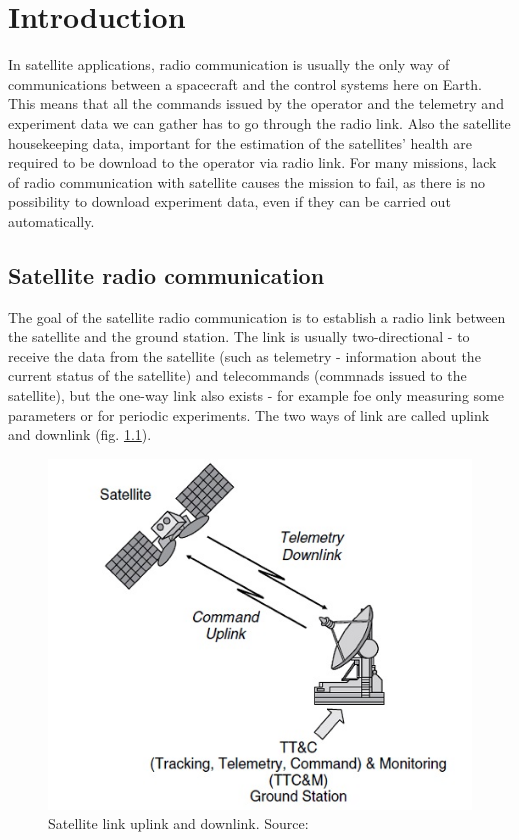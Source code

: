 \chapter{Introduction}
In satellite applications, radio communication is usually the only way of communications between a spacecraft and the control systems here on Earth. This means that all the commands issued by the operator and the telemetry and experiment data we can gather has to go through the radio link. Also the satellite housekeeping data, important for the estimation of the satellites' health are required to be download to the operator via radio link. For many missions, lack of radio communication with satellite causes the mission to fail, as there is no possibility to download experiment data, even if they can be carried out automatically.

\section{Satellite radio communication}
The goal of the satellite radio communication is to establish a radio link between the satellite and the ground station. The link is usually two-directional - to receive the data from the satellite (such as telemetry - information about the current status of the satellite) and telecommands (commnads issued to the satellite), but the one-way link also exists - for example foe only measuring some parameters or for periodic experiments. The two ways of link are called uplink and downlink (fig. \ref{intro:uplink_downlink}). 
\begin{figure}[h]
    \centering
    \includegraphics[width=0.5\paperwidth]{img/2/uplink_downlink.jpg}
    \caption{Satellite link uplink and downlink. Source: \cite{satcom_decription}}
    \label{intro:uplink_downlink}
\end{figure}

